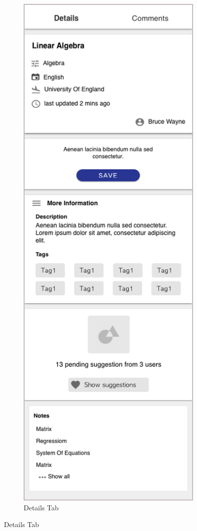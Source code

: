 \documentclass[thesis=B,english]{FITthesis}[2012/10/20]
\begin{document}
\begin{figure}[h]
\begin{subfigure}{.5\textwidth}
  \includegraphics[scale=0.45]{comments}
  \caption{Details Tab}
  \label{fig:published-details}

\end{subfigure}
\end{figure}
\end{document}
